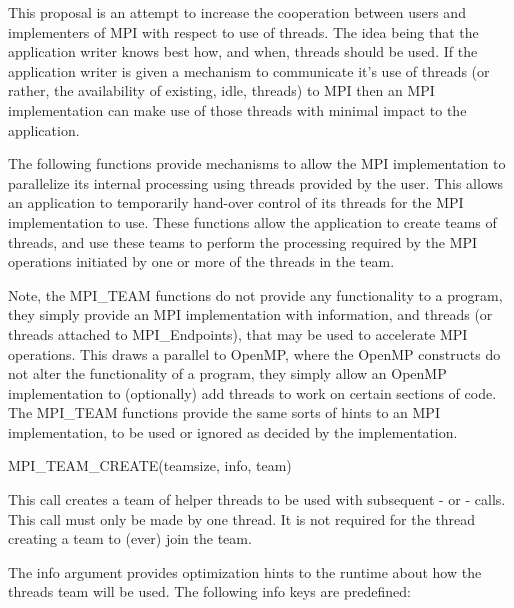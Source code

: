 This proposal is an attempt to increase the cooperation between users
and implementers of MPI with respect to use of threads. The idea being
that the application writer knows best how, and when, threads should
be used. If the application writer is given a mechanism to communicate
it's use of threads (or rather, the availability of existing, idle,
threads) to MPI then an MPI implementation can make use of those
threads with minimal impact to the application.

The following functions provide mechanisms to allow the MPI
implementation to parallelize its internal processing using
threads provided by the user. This
allows an application to temporarily hand-over control of
its threads for the MPI implementation to use. These functions allow
the application to create teams of threads, and use these teams to
perform the processing required by the MPI operations initiated by
one or more of the threads in the team.

Note, the MPI\_TEAM functions do not provide any functionality to a program, they
simply provide an MPI implementation with information,
and threads (or threads attached to MPI\_Endpoints), that
may be used to accelerate MPI operations. This draws a parallel to OpenMP,
where the OpenMP constructs do not alter the functionality of a program,
they simply allow an OpenMP implementation to (optionally) add threads to
work on certain sections of code. The MPI\_TEAM functions provide the same
sorts of hints to an MPI implementation, to be used or ignored as decided
by the implementation.

\begin{funcdef}{MPI\_TEAM\_CREATE(teamsize, info, team)}
\end{funcdef}



This call creates a team of helper threads to be used with subsequent
 -
or
 -
 calls. This call must only be made by one
thread. It is not required for the thread creating a team to
(ever) join the team.

The info argument provides optimization hints to the runtime about
how the threads team will be used. The following info
keys are predefined:

